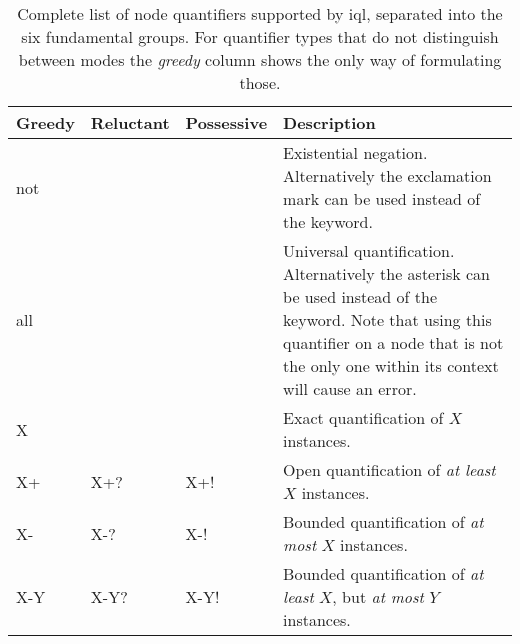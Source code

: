 \documentclass[11pt,a4paper]{article}
\begin{document}
\begin{table}[!htb]\centering
	\begin{tabular}{|p{}|p{}|p{}|p{}|}
		\hline 
		\textbf{Greedy} & \textbf{Reluctant} & \textbf{Possessive} & \textbf{Description} \\ 
		\hline 
		\hline  
		not &  &  & Existential negation. Alternatively the exclamation mark \lit{!} can be used instead of the \keyword{not} keyword. \\ 
		\hline  
		all &  &  & Universal quantification. Alternatively the asterisk \lit{*} can be used instead of the \keyword{all} keyword. Note that using this quantifier on a node that is not the only one within its context will cause an error. \\ 
		\hline 
		X &  &  & Exact quantification of $X$ instances. \\ 
		\hline 
		X+ & X+? & X+! & Open quantification of \textit{at least} $X$ instances. \\ 
		\hline 
		X- & X-? & X-! & Bounded quantification of \textit{at most} $X$ instances. \\ 
		\hline 
		X-Y & X-Y? & X-Y! & Bounded quantification of \textit{at least} $X$, but \textit{at most} $Y$ instances. \\ 
		\hline 
	\end{tabular}
	\caption[Node quantifiers]{Complete list of node quantifiers supported by \ac{iql}, separated into the six fundamental groups. For quantifier types that do not distinguish between modes the \textit{greedy} column shows the only way of formulating those.}
	\label{tab:quantifiers}
\end{table}



\begin{comment}
/*
* Quantification rules (N is assumed to be the collection of subsequent nodes):
*
* not  - existential negation
* 
* all  - greedy universal quantification -> match as many as possible, considering N
* all? - reluctant universal quantification -> match as few as possible, considering N
* all! - possessive universal quantification -> match ALL available with no regard for N
* 
* X    - greedily match exactly X instances
* X?   - reluctantly match X instances if subsequent nodes can still be matched by N
* X!   - possessively match X instances, extending without consideration for N
* 
* X+   - greedily match X or more instances, considering N
* X+?  - reluctantly match X or more instances, considering N
* X+!  - possessively match at least X instances, extending without consideration for N
* 
* X-   - greedily match up to X instances, considering N
* X-?  - reluctantly match up to X instances, considering N
* X-!  - possessively match up to X instances, extending without consideration for N
* 
* X-Y  - greedily match X to Y instances, leaving room for N
* X-Y? - reluctantly match X to Y instances, leaving room for N
* X-Y! - possessively match X to Y instances, extending without consideration for N
*/
\end{comment}
\end{document}
